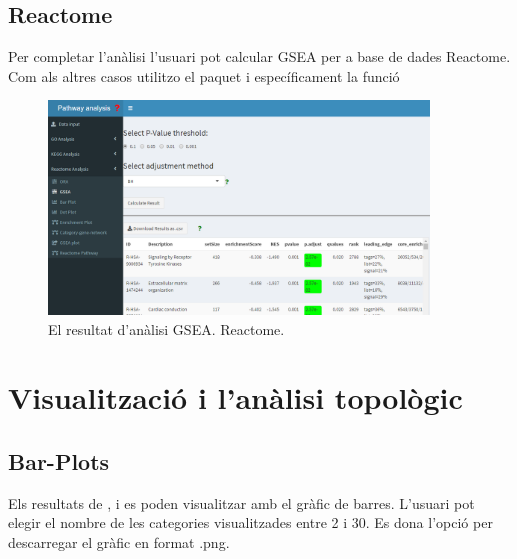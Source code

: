 \subsection{Reactome}
Per completar l'anàlisi l'usuari pot calcular GSEA per a base de dades Reactome. Com als altres casos utilitzo el paquet  i específicament la funció 

\begin{figure}[H]
\centering
\includegraphics[width=0.9\textwidth]{figures/App_F13_Items_RA_GSEA.png} 
\caption{El resultat d'anàlisi GSEA. Reactome.}
\end{figure}

\section{Visualització i l'anàlisi topològic}

\subsection{Bar-Plots}
Els resultats de ,  i  es poden visualitzar amb el gràfic de barres. L'usuari pot elegir el nombre de les categories visualitzades entre 2 i 30. Es dona l'opció per descarregar el gràfic en format .png.

